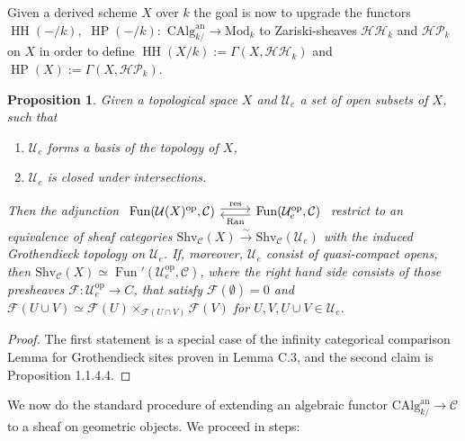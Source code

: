 \documentclass[10pt, reqno]{amsart}
\newtheorem{proposition}[theorem]{Proposition}
\theoremstyle{definition}
\theoremstyle{remark}
\newcommand{\CAlg}{\mathrm{CAlg}}
\newcommand{\op}{\mathrm{op}}
\newcommand{\C}{\mathcal{C}}
\newcommand{\Mod}{\mathrm{Mod}}
\newcommand{\an}{\mathrm{an}}
\newcommand{\F}{\mathcal{F}}
\newcommand{\Shv}{\mathrm{Shv}}
\newcommand{\U}{\mathcal{U}}
\newcommand{\shvHH}{\mathcal{HH}}
\newcommand{\shvHP}{\mathcal{HP}}
\DeclareMathOperator{\HH}{\mathrm{HH}}
\DeclareMathOperator{\HP}{\mathrm{HP}}
\DeclareMathOperator{\Fun}{\mathrm{Fun}}
\begin{document}
Given a derived scheme $X$ over $k$ the goal is now to upgrade the functors $\HH(-/k),$ $\HP(-/k)\colon$ $\CAlg^\an_{k/}\to \Mod_k$ to Zariski-sheaves $\shvHH_k$ and $\shvHP_k$ on $X$ in order to define $\HH(X/k):=\Gamma(X,\shvHH_k)$ and $\HP(X):=\Gamma(X,\shvHP_k)$.

\begin{proposition}\label{extend_condition}
	Given a topological space $X$ and $\mathcal U_e$ a set of open subsets of $X$, such that
	\begin{enumerate}
		\item $\mathcal U_e$ forms a basis of the topology of $X$,
		\item $\mathcal U_e$ is closed under intersections.
	\end{enumerate}
	Then the adjunction $\begin{tikzcd}\Fun(\mathcal U(X)^\op,\C)\ar[r,shift left = 1, "\mathrm{res}"]&\Fun(\mathcal U_e^\op,\C)\ar[l, shift left=1, "\mathrm{Ran}"]\end{tikzcd}$ restrict to an equivalence of sheaf categories
	$\Shv_\C(X)\xrightarrow\sim\Shv_\C(\mathcal U_e)$
	with the induced Grothendieck topology on $\U_e$. If, moreover, $\mathcal U_e$ consist of quasi-compact opens,
	then $\Shv_\C(X)\simeq\Fun'(\U_e^\op,\C)$, where the right hand side consists of those presheaves $\F\colon\U_e^\op\to C$, that satisfy $\F(\emptyset)=0$ and $\F(U\cup V)\simeq \F(U)\times_{\F(U\cap V)}\F(V)$ for $U,V,U\cup V\in\U_e$.
\end{proposition}
\begin{proof}
	The first statement is a special case of the infinity categorical comparison Lemma for Grothendieck sites proven in \cite{Hoy14} Lemma C.3, and the second claim is \cite{Lur18} Proposition 1.1.4.4.
\end{proof}

We now do the standard procedure of extending an algebraic functor $\CAlg^\an_{k/}\to \C$ to a sheaf on geometric objects. We proceed in steps:
\end{document}
